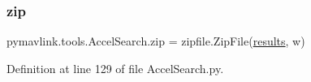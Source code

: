 \subsubsection{\texorpdfstring{zip}{zip}}
{\footnotesize\ttfamily pymavlink.\+tools.\+Accel\+Search.\+zip = zipfile.\+Zip\+File(\mbox{\hyperlink{namespacepymavlink_1_1tools_1_1AccelSearch_a9a479651d64962eb0d1d91b8e0508a30}{results}}, \textquotesingle{}w\textquotesingle{})}



Definition at line 129 of file Accel\+Search.\+py.

